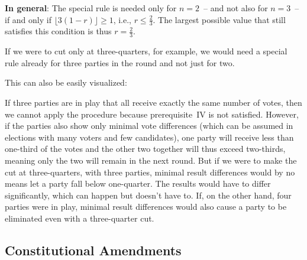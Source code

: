 \textbf{In general}: The special rule is needed only for $n = 2$~-- and
not also for $n = 3$~-- if and only if $\lfloor 3(1-r) \rfloor \geq 1$, i.e., $r \leq \frac{2}{3}$.
The largest possible value that still satisfies this condition is thus $r = \frac{2}{3}$.

If we were to cut only at three-quarters, for example, we would need a special rule
already for three parties in the round and not just for two.

This can also be easily visualized:

If three parties are in play that all receive exactly the same number of votes, then we cannot
apply the procedure because prerequisite~IV is not satisfied. However, if the parties also
show only minimal vote differences (which can be assumed in elections with many voters and few
candidates), one party will receive less than one-third of the votes and
the other two together will thus exceed two-thirds, meaning only the
two will remain in the next round. But if we were to make the cut at three-quarters, with three
parties, minimal result differences would by no means let a party fall below one-quarter.
The results would have to differ significantly, which can happen but doesn't have to.
If, on the other hand, four parties were in play, minimal result differences would also
cause a party to be eliminated even with a three-quarter cut.

\subsection{Constitutional Amendments}

